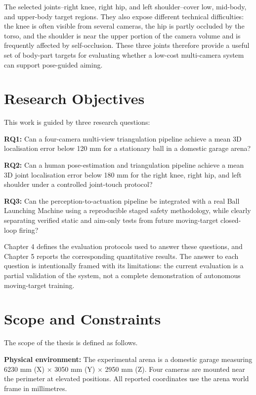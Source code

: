 The selected joints--right knee, right hip, and left shoulder--cover low, mid-body, and upper-body target regions. They also expose different technical difficulties: the knee is often visible from several cameras, the hip is partly occluded by the torso, and the shoulder is near the upper portion of the camera volume and is frequently affected by self-occlusion. These three joints therefore provide a useful set of body-part targets for evaluating whether a low-cost multi-camera system can support pose-guided aiming.

\section{Research Objectives}

This work is guided by three research questions:

\textbf{RQ1:} Can a four-camera multi-view triangulation pipeline achieve a mean 3D localisation error below 120 mm for a stationary ball in a domestic garage arena?

\textbf{RQ2:} Can a human pose-estimation and triangulation pipeline achieve a mean 3D joint localisation error below 180 mm for the right knee, right hip, and left shoulder under a controlled joint-touch protocol?

\textbf{RQ3:} Can the perception-to-actuation pipeline be integrated with a real Ball Launching Machine using a reproducible staged safety methodology, while clearly separating verified static and aim-only tests from future moving-target closed-loop firing?

Chapter 4 defines the evaluation protocols used to answer these questions, and Chapter 5 reports the corresponding quantitative results. The answer to each question is intentionally framed with its limitations: the current evaluation is a partial validation of the system, not a complete demonstration of autonomous moving-target training.

\section{Scope and Constraints}

The scope of the thesis is defined as follows.

\textbf{Physical environment:} The experimental arena is a domestic garage measuring 6230 mm (X) $\times$ 3050 mm (Y) $\times$ 2950 mm (Z). Four cameras are mounted near the perimeter at elevated positions. All reported coordinates use the arena world frame in millimetres.


